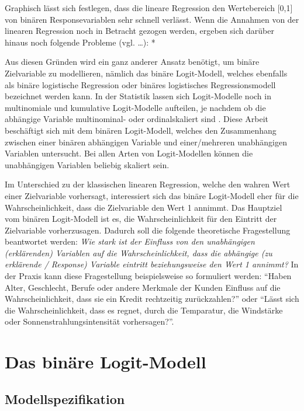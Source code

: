 \documentclass[12pt,]{article}
\begin{document}
Graphisch lässt sich festlegen, dass die lineare Regression den
Wertebereich {[}0,1{]} von binären Responsevariablen sehr schnell
verlässt. Wenn die Annahmen von der linearen Regression noch in Betracht
gezogen werden, ergeben sich darüber hinaus noch folgende Probleme (vgl.
\ldots{}): \emph{ } *

Aus diesen Gründen wird ein ganz anderer Ansatz benötigt, um binäre
Zielvariable zu modellieren, nämlich das binäre Logit-Modell, welches
ebenfalls als binäre logistische Regression oder binäres logistisches
Regressionsmodell bezeichnet werden kann. In der Statistik lassen sich
Logit-Modelle noch in multinomiale und kumulative Logit-Modelle
aufteilen, je nachdem ob die abhängige Variable multinominal- oder
ordinalskaliert sind . Diese Arbeit beschäftigt sich mit dem binären
Logit-Modell, welches den Zusammenhang zwischen einer binären abhängigen
Variable und einer/mehreren unabhängigen Variablen untersucht. Bei allen
Arten von Logit-Modellen können die unabhängigen Variablen beliebig
skaliert sein.

Im Unterschied zu der klassischen linearen Regression, welche den wahren
Wert einer Zielvariable vorhersagt, interessiert sich das binäre
Logit-Modell eher für die Wahrscheinlichkeit, dass die Zielvariable den
Wert 1 annimmt. Das Hauptziel vom binären Logit-Modell ist es, die
Wahrscheinlichkeit für den Eintritt der Zielvariable vorherzusagen.
Dadurch soll die folgende theoretische Fragestellung beantwortet werden:
\emph{Wie stark ist der Einfluss von den unabhängigen (erklärenden)
Variablen auf die Wahrscheinlichkeit, dass die abhängige (zu erklärende
/ Response) Variable eintritt beziehungsweise den Wert 1 annimmt?} In
der Praxis kann diese Fragestellung beispielsweise so formuliert werden:
``Haben Alter, Geschlecht, Berufe oder andere Merkmale der Kunden
Einfluss auf die Wahrscheinlichkeit, dass sie ein Kredit rechtzeitig
zurückzahlen?'' oder ``Lässt sich die Wahrscheinlichkeit, dass es
regnet, durch die Temparatur, die Windstärke oder
Sonnenstrahlungsintensität vorhersagen?''.

\section{Das binäre Logit-Modell}\label{das-binare-logit-modell}

\subsection{Modellspezifikation}\label{modellspezifikation}
\end{document}
